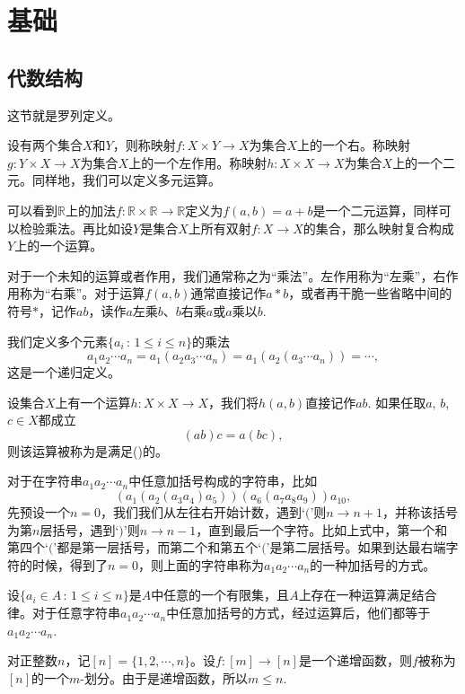 \renewcommand\chapterimg{../Pictures/8.png}
\chapter{基础}

\section{代数结构}

这节就是罗列定义。

\para 设有两个集合$X$和$Y$，则称映射$f:X\times Y \to X$为集合$X$上的一个右。称映射$g:Y\times X \to X$为集合$X$上的一个左作用。称映射$h:X\times X \to X$为集合$X$上的一个二元。同样地，我们可以定义多元运算。

可以看到$\mathbb{R}$上的加法$f:\mathbb{R}\times \mathbb{R} \to \mathbb{R}$定义为$f(a,b)=a+b$是一个二元运算，同样可以检验乘法。再比如设$Y$是集合$X$上所有双射$f:X\to X$的集合，那么映射复合构成$Y$上的一个运算。

对于一个未知的运算或者作用，我们通常称之为“乘法”。左作用称为“左乘”，右作用称为“右乘”。对于运算$f(a,b)$通常直接记作$a*b$，或者再干脆一些省略中间的符号$*$，记作$ab$，读作$a$左乘$b$、$b$右乘$a$或$a$乘以$b$.

我们定义多个元素$\{a_i\,:\, 1\leq i \leq n\}$的乘法
\[
	a_1a_2\cdots a_n=a_1(a_2a_3\cdots a_n)=a_1(a_2(a_3\cdots a_n))=\cdots,
\]
这是一个递归定义。

\para 设集合$X$上有一个运算$h:X\times X \to X$，我们将$h(a,b)$直接记作$ab$. 如果任取$a$, $b$, $c\in X$都成立
\[
	(ab)c=a(bc),
\]
则该运算被称为是满足()的。

\para 对于在字符串$a_1a_2\cdots a_n$中任意加括号构成的字符串，比如
\[
(a_1(a_2(a_3a_4)a_5))(a_6(a_7a_8a_9))a_{10},
\]
先预设一个$n=0$，我们我们从左往右开始计数，遇到`$($'则$n\to n+1$，并称该括号为第$n$层括号，遇到`$)$'则$n\to n-1$，直到最后一个字符。比如上式中，第一个和第四个`$($'都是第一层括号，而第二个和第五个`$($'是第二层括号。如果到达最右端字符的时候，得到了$n=0$，则上面的字符串称为$a_1a_2\cdots a_n$的一种加括号的方式。

\pro 设$\{a_i\in A\,:\, 1\leq i\leq n\}$是$A$中任意的一个有限集，且$A$上存在一种运算满足结合律。对于任意字符串$a_1a_2\cdots a_n$中任意加括号的方式，经过运算后，他们都等于$a_1a_2\cdots a_n$.

\proof 对正整数$n$，记$[n]=\{1,2,\cdots,n\}$。设$f:[m]\to [n]$是一个递增函数，则$f$被称为$[n]$的一个$m$-划分。由于是递增函数，所以$m\leq n$. 

